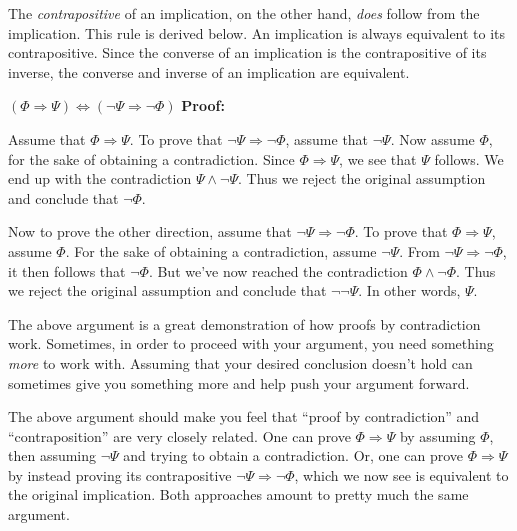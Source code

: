 \documentclass[12pt]{article}
\newcommand{\AND}{\wedge}
\newcommand{\ARR}{\Rightarrow}
\newcommand{\DARR}{\Leftrightarrow}
\newcounter{rule}
\newcounter{theorem}
\def\putRuleNumber{\refstepcounter{rule}\therule}
\newcommand{\DRULEPF}[3]{\begin{tcolorbox}[title=Derived Rule \putRuleNumber: #1,colbacktitle=white,coltitle=black,colback=white] {#2} \tcblower \textbf{Proof:} {#3} \end{tcolorbox}}
\def\pA{\Phi}
\def\pB{\Psi}
\def\pC{\Omega}
\def\pD{\Sigma}
\begin{document}
The \emph{contrapositive} of an implication, on the other hand, \emph{does} follow from the implication.
This rule is derived below.
\hypertarget{hl:contraposition}{An} implication is always equivalent to its contrapositive.
Since the converse of an implication is the contrapositive of its inverse, the converse and inverse of an implication are equivalent.






\DRULEPF{Contraposition\label{drule:contraposition}}{$(\pA\ARR\pB)\DARR(\neg\pB\ARR\neg\pA)$}{
Assume that $\pA\ARR\pB$.
To prove that $\neg\pB\ARR\neg\pA$, assume that $\neg\pB$.
Now assume $\pA$, for the sake of obtaining a contradiction.
Since $\pA\ARR\pB$, we see that $\pB$ follows. We end up with the contradiction $\pB\AND\neg\pB$.
Thus we reject the original assumption and conclude that $\neg\pA$.
\lsp

Now to prove the other direction, assume that $\neg\pB\ARR\neg\pA$.
To prove that $\pA\ARR\pB$, assume $\pA$.
For the sake of obtaining a contradiction, assume $\neg\pB$.
From $\neg\pB\ARR\neg\pA$, it then follows that $\neg\pA$.
But we've now reached the contradiction $\pA\AND\neg\pA$.
Thus we reject the original assumption and conclude that $\neg\neg\pB$.
In other words, $\pB$.
}

The above argument is a great demonstration of how proofs by contradiction work.
Sometimes, in order to proceed with your argument, you need something \emph{more} to work with.
Assuming that your desired conclusion doesn't hold can sometimes give you something more and help push your argument forward.

The above argument should make you feel that ``proof by contradiction'' and ``contraposition'' are very closely related.
One can prove $\pA\ARR\pB$ by assuming $\pA$, then assuming $\neg\pB$ and trying to obtain a contradiction.
Or, one can prove $\pA\ARR\pB$ by instead proving its contrapositive $\neg\pB\ARR\neg\pA$, which we now see is equivalent to the original implication.
Both approaches amount to pretty much the same argument.

\vspace{1em}
\end{document}
